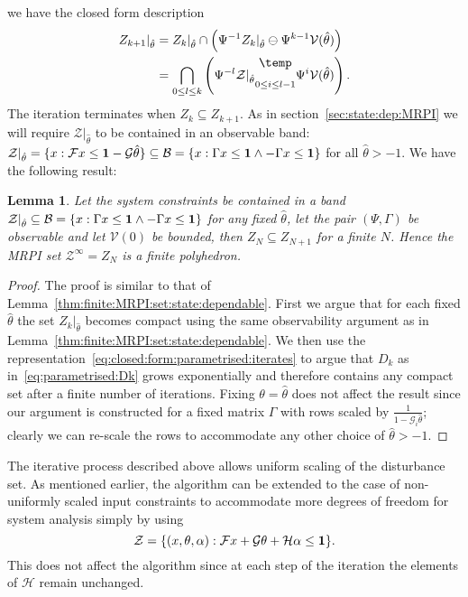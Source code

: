 \documentclass[letterpaper, 10pt, conference]{ieeeconf} %
\newtheorem{thm}{Lemma}[section]
\newcommand{\bigominus}{\raisebox{10pt}{$\temp$}}
\begin{document}
we have the closed form description
%
\begin{equation}\label{eq:closed:form:parametrised:iterates}
\begin{split}
	Z_{k+1}\vert_{\hat\theta} &= Z_{k}\vert_{\hat\theta}\cap\left(
	\Psi^{-1}Z_k\vert_{\hat\theta}\ominus\Psi^{k-1}\mathcal V(\hat\theta)\right)\\
	&=\bigcap_{0\leq l\leq k}\left(\Psi^{-l}\mathcal Z\vert_{\hat\theta}\underset{0\leq i\leq l-1}{\bigominus} 
	\Psi^i \mathcal V(\hat\theta)
	\right).
\end{split}
\end{equation}
%
The iteration terminates when $Z_k\subseteq Z_{k+1}$. As in section~\ref{sec:state:dep:MRPI}
we will require $\mathcal Z\vert_{\hat\theta}$ to be contained in an observable band: $\mathcal Z\vert_{\hat\theta}
=\{x:\mathcal Fx \leq {\bf{1}}-\mathcal G\hat\theta\}\subseteq \mathcal B=\{x:\Gamma x\leq {\bf{1}}\wedge -\Gamma 
x\leq {\bf{1}}\}$ for all $\hat\theta>-1$. We have the following result:
%
\begin{thm}
Let the system constraints be contained in a band $\mathcal Z\vert_{\hat\theta}\subseteq\mathcal 
B=\{x:\Gamma x\leq {\bf{1}}\wedge -\Gamma x\leq {\bf{1}}\}$ for any fixed $\hat\theta$, let the
pair $(\Psi,\Gamma)$ be observable and let $\mathcal V(0)$ be bounded, then $Z_N\subseteq Z_{N+1}$
for a finite $N$. Hence the MRPI set $\mathcal Z^\infty = Z_N$ is a finite polyhedron.
\end{thm}
%
\begin{proof}
The proof is similar to that of Lemma~\ref{thm:finite:MRPI:set:state:dependable}.
First we argue that for each fixed $\hat\theta$ the set $Z_k\vert_{\hat\theta}$ becomes compact using the same
observability argument as in Lemma~\ref{thm:finite:MRPI:set:state:dependable}.
We then use the representation~\eqref{eq:closed:form:parametrised:iterates} to argue that $D_k$ as
in~\eqref{eq:parametrised:Dk} grows exponentially and therefore contains any compact set after a finite number
of iterations. Fixing $\theta=\hat\theta$ does not affect the result since
our argument is constructed for a fixed matrix $\Gamma$ with rows scaled by 
$\frac{1}{1-\mathcal G_i\hat\theta}$; clearly we can re-scale the rows to accommodate any other choice of $\hat\theta>-1$.
\end{proof}

The iterative process described above allows uniform scaling of the disturbance set. As mentioned earlier, the 
algorithm can be extended to the case of non-uniformly scaled input constraints to accommodate more degrees of freedom for 
system analysis simply by using 
%
\[
\mathcal Z = \{(x,\theta,\alpha): \mathcal F x + \mathcal G\theta + 
\mathcal H \alpha \leq {\bf{1}}\}.
\]
%
This does not affect the algorithm since at each step of the iteration 
the elements of $\mathcal H$ remain unchanged. 
%
%
%
%
%
%
\end{document}
